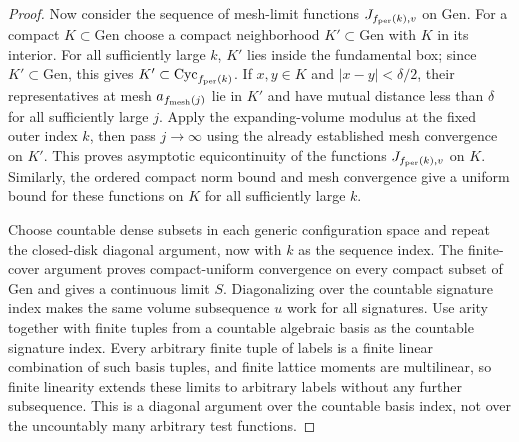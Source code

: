 \begin{proof}
Now consider the sequence of mesh-limit functions $J_{f_{\rm per}(k),v}$ on
$\mathrm{Gen}$. For a compact $K\subset\mathrm{Gen}$ choose a compact neighborhood
$K'\subset\mathrm{Gen}$ with $K$ in its interior. For all sufficiently large $k$, $K'$ lies inside the fundamental box; since $K'\subset\mathrm{Gen}$, this gives $K'\subset\mathrm{Cyc}_{f_{\rm per}(k)}$. If $x,y\in K$ and
$|x-y|<\delta/2$, their representatives at mesh $a_{f_{\rm mesh}(j)}$ lie
in $K'$ and have mutual distance less than $\delta$ for all sufficiently
large $j$. Apply the expanding-volume modulus at the fixed outer index $k$,
then pass $j\to\infty$ using the already established mesh convergence on
$K'$. This proves asymptotic equicontinuity of the functions $J_{f_{\rm per}(k),v}$ on
$K$. Similarly, the ordered compact norm bound and mesh convergence give a
uniform bound for these functions on $K$ for all sufficiently large $k$.

Choose countable dense subsets in each generic configuration space and
repeat the closed-disk diagonal argument, now with $k$ as the sequence index.
The finite-cover argument proves compact-uniform convergence on every compact
subset of $\mathrm{Gen}$ and gives a continuous limit $S$. Diagonalizing over
the countable signature index makes the same volume subsequence $u$ work for
all signatures. Use arity together with finite tuples from a
countable algebraic basis as the countable signature index. Every arbitrary finite tuple of labels is a finite
linear combination of such basis tuples, and finite lattice moments are
multilinear, so finite linearity extends these limits to arbitrary labels
without any further subsequence. This is a diagonal argument over the countable basis index, not over the
uncountably many arbitrary test functions.


\end{proof}
